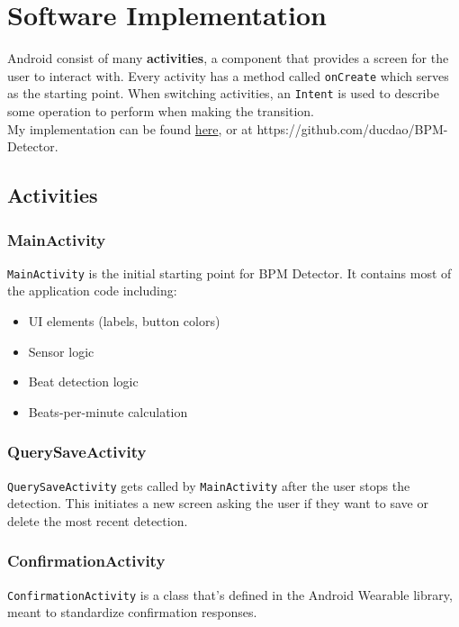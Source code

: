 \documentclass[12pt]{article}
\begin{document}
\section{Software Implementation}
Android consist of many \textbf{activities}, a component that provides a screen for the user to interact with. Every activity has a method called \texttt{onCreate} which serves as the starting point. When switching activities, an \texttt{Intent} is used to describe some operation to perform when making the transition. \\

My implementation can be found \href{https://github.com/ducdao/BPM-Detector}{here}, or at https://github.com/ducdao/BPM-Detector.

\subsection{Activities}
\subsubsection{MainActivity}
\texttt{MainActivity} is the initial starting point for BPM Detector. It contains most of the application code including:
\begin{itemize}
\item UI elements (labels, button colors)
\item Sensor logic
\item Beat detection logic
\item Beats-per-minute calculation
\end{itemize}

\subsubsection{QuerySaveActivity}
\texttt{QuerySaveActivity} gets called by \texttt{MainActivity} after the user stops the detection. This initiates a new screen asking the user if they want to save or delete the most recent detection. 

\subsubsection{ConfirmationActivity}
\texttt{ConfirmationActivity} is a class that's defined in the Android Wearable library, meant to standardize confirmation responses.

\end{document}
